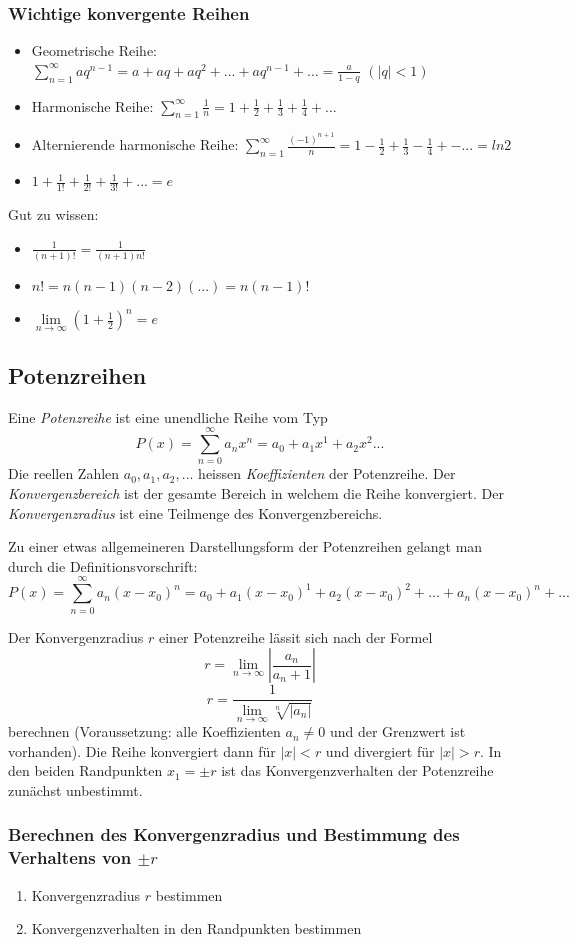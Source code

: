 \subsubsection*{Wichtige konvergente Reihen}
\begin{itemize}
	\item Geometrische Reihe: \\$\sum\limits_{n=1}^{\infty} aq^{n-1} = a + aq + aq^2 + ... + aq^{n-1} + ... = \frac{a}{1-q}$  $(|q| <1)$
	\item Harmonische Reihe: $\sum\limits_{n=1}^{\infty} \frac{1}{n} = 1 + \frac{1}{2} + \frac{1}{3} + \frac{1}{4} + ...$
	\item Alternierende harmonische Reihe: $\sum\limits_{n=1}^{\infty} \frac{(-1)^{n+1}}{n} = 1 - \frac{1}{2} + \frac{1}{3} - \frac{1}{4} + - ... = ln{2}$
	\item $1 + \frac{1}{1!} + \frac{1}{2!}+\frac{1}{3!} + ... = e$
\end{itemize}
Gut zu wissen:
\begin{itemize}
	\item $\frac{1}{(n+1)!} = \frac{1}{(n+1)n!}$
	\item $n! = n(n-1)(n-2)(...) = n(n-1)!$\\
	\item $\lim\limits_{n \rightarrow \infty}(1+\frac{1}{2})^n = e$
\end{itemize}

\subsection{Potenzreihen}
\begin{definition}Eine \textit{Potenzreihe} ist eine unendliche Reihe vom Typ $$P(x)= \sum\limits_{n=0}^{\infty} a_n x^n = a_0 + a_1x^1 + a_2 x^2 ...$$
Die reellen Zahlen $a_0, a_1, a_2, ...$ heissen \textit{Koeffizienten} der Potenzreihe. Der \textit{Konvergenzbereich} ist der gesamte Bereich in welchem die Reihe konvergiert. Der \textit{Konvergenzradius} ist eine Teilmenge des Konvergenzbereichs.
\end{definition}
Zu einer etwas allgemeineren Darstellungsform der Potenzreihen gelangt man durch die Definitionsvorschrift:
$$P(x) = \sum\limits_{n=0}^{\infty} a_n (x-x_0)^n = a_0 + a_1(x-x_0)^1 + a_2(x-x_0)^2 + ... + a_n(x-x_0)^n + ...$$
\begin{formel}
Der Konvergenzradius $r$ einer Potenzreihe lässit sich nach der Formel 
$$r = \lim\limits_{n \rightarrow \infty} \left|\frac{a_n}{a_n+1}\right|$$
$$r = \frac{1}{\lim\limits_{n \rightarrow \infty} \sqrt[n]{\left|a_n\right|}}$$
berechnen (Voraussetzung: alle Koeffizienten $a_n \neq 0$ und der Grenzwert ist vorhanden). Die Reihe konvergiert dann für $|x| < r$ und divergiert für $|x|>r$. In den beiden Randpunkten $x_1 = \pm r$ ist das Konvergenzverhalten der Potenzreihe zunächst unbestimmt.
\end{formel}

\subsubsection*{Berechnen des Konvergenzradius und Bestimmung des Verhaltens von $\pm r$}
\begin{enumerate}
	\item Konvergenzradius $r$ bestimmen
	\item Konvergenzverhalten in den Randpunkten bestimmen
\end{enumerate}